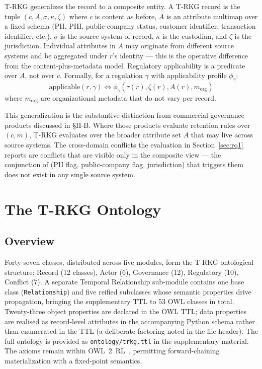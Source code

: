 \documentclass{ieeeaccess}
\begin{document}
T-RKG generalizes the record to a composite entity. A T-RKG record is the tuple $(c, A, \sigma, \kappa, \zeta)$ where $c$ is content as before, $A$ is an attribute multimap over a fixed schema (PII, PHI, public-company status, customer identifier, transaction identifier, etc.), $\sigma$ is the source system of record, $\kappa$ is the custodian, and $\zeta$ is the jurisdiction. Individual attributes in $A$ may originate from different source systems and be aggregated under $r$'s identity --- this is the operative difference from the content-plus-metadata model. Regulatory applicability is a predicate over $A$, not over $c$. Formally, for a regulation $\gamma$ with applicability profile $\phi_\gamma$:
\begin{equation}
    \mathrm{applicable}(r, \gamma) \iff \phi_\gamma(\tau(r), \zeta(r), A(r), m_{\mathrm{org}})
\end{equation}
where $m_{\mathrm{org}}$ are organizational metadata that do not vary per record.

This generalization is the substantive distinction from commercial governance products discussed in §II-B. Where those products evaluate retention rules over $(c, m)$, T-RKG evaluates over the broader attribute set $A$ that may live across source systems. The cross-domain conflicts the evaluation in Section~\ref{sec:rq1} reports are conflicts that are visible only in the composite view --- the conjunction of (PII flag, public-company flag, jurisdiction) that triggers them does not exist in any single source system.

\section{The T-RKG Ontology}

\subsection{Overview}

Forty-seven classes, distributed across five modules, form the T-RKG ontological structure: Record (12 classes), Actor (6), Governance (12), Regulatory (10), Conflict (7). A separate Temporal Relationship sub-module contains one base class (\texttt{Relationship}) and five reified subclasses whose semantic properties drive propagation, bringing the supplementary TTL to 53 OWL classes in total. Twenty-three object properties are declared in the OWL TTL; data properties are realised as record-level attributes in the accompanying Python schema rather than enumerated in the TTL (a deliberate factoring noted in the file header). The full ontology is provided as \texttt{ontology/trkg.ttl} in the supplementary material. The axioms remain within OWL~2~RL~\cite{owl2}, permitting forward-chaining materialization with a fixed-point semantics.
\end{document}
